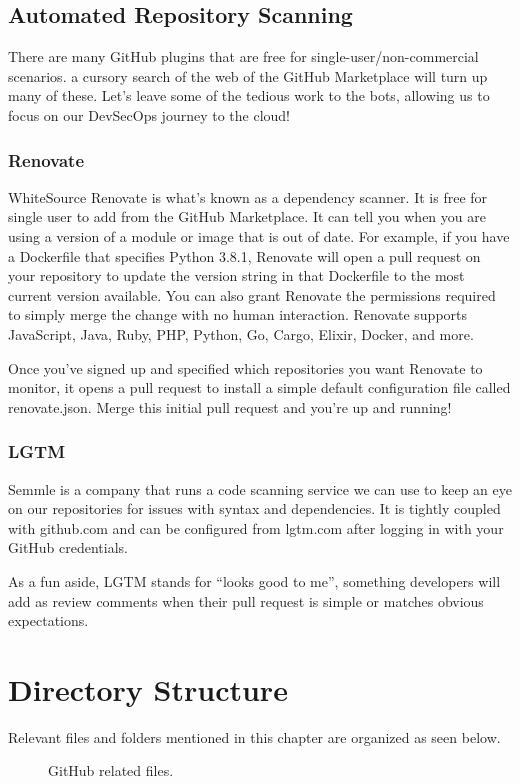 \subsection{Automated Repository Scanning}

\justify{}
There are many GitHub plugins that are free for single-user/non-commercial scenarios. a cursory search of the web of the
GitHub Marketplace will turn up many of these. Let's leave some of the
tedious work to the bots, allowing us to focus on our DevSecOps journey to the cloud!

\subsubsection{Renovate}

\justify{}
WhiteSource Renovate is what's known as a dependency scanner. It is free
for single user to add from the GitHub Marketplace. It can tell you when you are using
a version of a module or image that
is out of date. For example, if you have a Dockerfile that specifies
Python 3.8.1, Renovate will open a pull request on your repository to
update the version string in that Dockerfile to the most current version
available. You can also grant Renovate the permissions required to
simply merge the change with no human interaction. Renovate supports
JavaScript, Java, Ruby, PHP, Python, Go, Cargo, Elixir, Docker, and
more.

\justify{}
Once you've signed up and specified which repositories you want Renovate to monitor, it opens a pull request to install a simple default
configuration file called renovate.json. Merge this initial pull request and you're up and running!

\subsubsection{LGTM}

\justify{}
Semmle is a company that runs a code scanning service we can use to keep
an eye on our repositories for issues with syntax and dependencies. It
is tightly coupled with github.com and can be configured from lgtm.com
after logging in with your GitHub credentials.

\justify{}
As a fun aside, LGTM stands for ``looks good to me'', something developers
will add as review comments when their pull request is simple or matches
obvious expectations.
\clearpage

\section{Directory Structure}

\justify{}
Relevant files and folders mentioned in this chapter are organized as
seen below.

\begin{figure}[!htb]
      \centering
      
      \caption{GitHub related files.}
      \label{githubfiles}
\end{figure}
